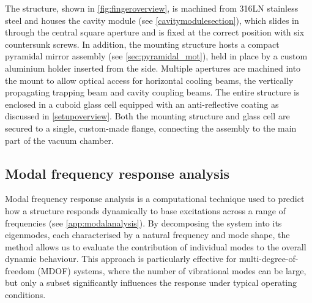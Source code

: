 \documentclass[../Thesis-IJspeert.tex]{subfiles}
\begin{document}
The structure, shown in \autoref{fig:fingeroverview}, is machined from 316LN stainless steel and houses the cavity module (see \autoref{cavitymodulesection}), which slides in through the central square aperture and is fixed at the correct position with six countersunk screws. In addition, the mounting structure hosts a compact pyramidal mirror assembly (see \autoref{sec:pyramidal_mot}), held in place by a custom aluminium holder inserted from the side. Multiple apertures are machined into the mount to allow optical access for horizontal cooling beams, the vertically propagating trapping beam and cavity coupling beams. The entire structure is enclosed in a cuboid glass cell equipped with an anti-reflective coating as discussed in \autoref{setupoverview}. Both the mounting structure and glass cell are secured to a single, custom-made flange, connecting the assembly to the main part of the vacuum chamber.

\subsection{Modal frequency response analysis}
\label{glasssubstratemodalfreqresponse}
Modal frequency response analysis is a computational technique used to predict how a structure responds dynamically to base excitations across a range of frequencies (see \autoref{app:modalanalysis}). By decomposing the system into its eigenmodes, each characterised by a natural frequency and mode shape, the method allows us to evaluate the contribution of individual modes to the overall dynamic behaviour. This approach is particularly effective for multi-degree-of-freedom (MDOF) systems, where the number of vibrational modes can be large, but only a subset significantly influences the response under typical operating conditions.
\end{document}
